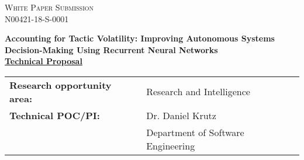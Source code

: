 \documentclass[12pt]{article}
\newcommand{\dan}[1]{\textcolor{blue}{{\it [Dan: #1]}}}
\newcommand{\Title}{Accounting for Tactic Volatility: Improving Autonomous Systems
Decision-Making Using Recurrent Neural Networks}
\newcommand{\CallNumber}{N00421-18-S-0001} %
\newcommand{\CallName}{XXXX}
\begin{document}
\begin{titlepage}

\newcommand{\HRule}{\rule{\linewidth}{0.3mm}} %







\begin{center}
  \textsc{\Large White Paper Submission}\\[0.5cm] %
  \textsc{\large \CallNumber}\\[1.5cm]   %
\end{center}

\noindent \LARGE \textbf{\Title}\\[.10cm] 


\noindent \large  \underline{\textbf{Technical Proposal}}\\ [.15cm] 

\begin{tabular}{ L{50mm} L{100mm} }



\normalsize \textbf{Research opportunity area:} & \normalsize  Research and Intelligence  \\ 

\normalsize \textbf{Technical POC/PI:} & \normalsize  Dr. Daniel Krutz \\
 & \vspace{-2mm} \normalsize Department of Software Engineering
 \\


\end{tabular}
\end{titlepage}
\end{document}
